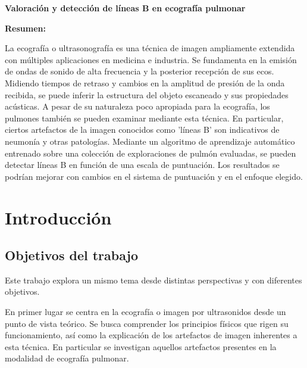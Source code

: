 \documentclass[11pt]{article} %
\begin{document}
{\bfseries \large Valoración y detección de líneas B en ecografía pulmonar}\vspace{10mm} 

{\bfseries \large Resumen:} \vspace{5mm}

La ecografía o ultrasonografía es una técnica de imagen ampliamente extendida con múltiples aplicaciones en medicina e industria. Se fundamenta en la emisión de ondas de sonido de alta frecuencia y la posterior recepción de sus ecos. Midiendo tiempos de retraso y cambios en la amplitud de presión de la onda recibida, se puede inferir la estructura del objeto escaneado y sus propiedades acústicas. A pesar de su naturaleza poco apropiada para la ecografía, los pulmones también se pueden examinar mediante esta técnica. En particular, ciertos artefactos de la imagen conocidos como 'líneas B' son indicativos de neumonía y otras patologías. Mediante un algoritmo de aprendizaje automático entrenado sobre una colección de exploraciones de pulmón evaluadas, se pueden detectar líneas B en función de una escala de puntuación. Los resultados se podrían mejorar con cambios en el sistema de puntuación y en el enfoque elegido.
\vspace{1cm}

\newpage



\tableofcontents
\newpage


\normalsize
\section{Introducción}


\subsection{Objetivos del trabajo}
	
	Este trabajo explora un mismo tema desde distintas perspectivas y con diferentes objetivos.

	En primer lugar se centra en la ecografía o imagen por ultrasonidos desde un punto de vista teórico. Se busca comprender los principios físicos que rigen su funcionamiento, así como la explicación de los artefactos de imagen inherentes a esta técnica. En particular se investigan aquellos artefactos presentes en la modalidad de ecografía pulmonar.
\end{document}

